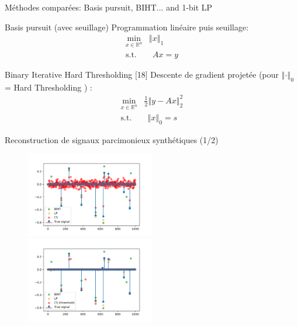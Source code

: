 \documentclass[10pt, aspectratio=169]{beamer}
\newcommand{\norm}[1]{\left\Vert #1 \right\Vert}
\begin{document}
\begin{frame}{Méthodes comparées: Basis pursuit, BIHT... and 1-bit LP}
\begin{block}{Basis pursuit (avec seuillage)}
\smallskip
Programmation linéaire puis seuillage:
   \begin{align*}
       \min_{x\in\mathbb R^n}{}& \norm{x}_1 \\
       \mathrm{s.t.} & ~~ Ax=y 
   \end{align*}
\end{block}
\begin{block}{Binary Iterative Hard Thresholding [18]}
\smallskip
Descente de gradient projetée (pour $\norm{\cdot}_0$ = Hard Thresholding ) :
    \begin{align*}
        \min_{x\in\mathbb R^n}{}& \frac{1}{2} \norm{y - Ax}_2^2\\
               \mathrm{s.t.} & ~~ \norm{x}_0 = s
    \end{align*}
\end{block}
\end{frame}
\begin{frame}{Reconstruction de signaux parcimonieux synthétiques (1/2)}
\begin{figure}
    \includegraphics[width=0.5\textwidth]{figures/recon-synth-500.png}%
    \includegraphics[width=0.5\textwidth]{figures/recon-synth-500-thresh.png}
\end{figure}    
\end{frame}
\end{document}
